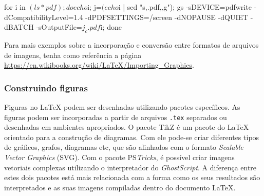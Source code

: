 
\begin{meucomando}
for i in $(ls *pdf); do echo $i; j=$(echo $i | sed "s,.pdf,,g"); gs -sDEVICE=pdfwrite -dCompatibilityLevel=1.4 -dPDFSETTINGS=/screen -dNOPAUSE -dQUIET -dBATCH -sOutputFile=${j}_c.pdf $i; done
\end{meucomando}

\begin{marker}
  Para mais exemplos sobre a incorporação e conversão entre formatos de arquivos de imagens, tenha como referência a página \url{https://en.wikibooks.org/wiki/LaTeX/Importing_Graphics}.
\end{marker}

\subsubsection*{Construindo figuras}
\label{sec:const_docs/figs}


Figuras no \LaTeX{} podem ser desenhadas utilizando pacotes específicos. As figuras podem ser incorporadas a partir de arquivos {\tt .tex} separados ou desenhadas em ambientes apropriados. O pacote TikZ é um pacote do \LaTeX{} orientado para a construção de diagramas. Com ele pode-se criar diferentes tipos de gráficos, grafos, diagramas etc, que são alinhados com o formato \textit{Scalable Vector Graphics} (SVG). Com o pacote PS\textit{Tricks}, é possível criar imagens vetoriais complexas utilizando o interpretador do \textit{GhostScript}. A diferença entre estes dois pacotes está mais relacionada com a forma como os seus resultados são interpretados e as suas imagens compiladas dentro do documento \LaTeX{}. %

%
%


